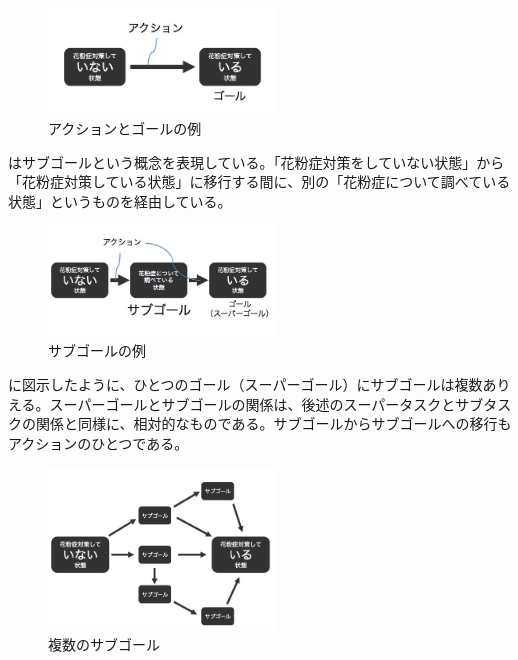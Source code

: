 \documentclass[submit,techreq]{ipsj}
\begin{document}
\begin{figure}[tb]
\includegraphics[width=6cm, bb=0 0 400 300]{action_goal.jpg}
\caption{アクションとゴールの例}
\label{fig:action_goal}
\end{figure}

はサブゴールという概念を表現している。「花粉症対策をしていない状態」から「花粉症対策している状態」に移行する間に、別の「花粉症について調べている状態」というものを経由している。


\begin{figure}[tb]
\includegraphics[width=6cm, bb=0 0 450 300]{sub_goal.jpg}
\caption{サブゴールの例}
\label{fig:sub_goal}
\end{figure}



に図示したように、ひとつのゴール（スーパーゴール）にサブゴールは複数ありえる。スーパーゴールとサブゴールの関係は、後述のスーパータスクとサブタスクの関係と同様に、相対的なものである。サブゴールからサブゴールへの移行もアクションのひとつである。



\begin{figure}[tb]
\includegraphics[width=6cm, bb=0 0 450 400]{many_sub_goals.jpg}
\caption{複数のサブゴール}
\label{fig:many_sub_goals}
\end{figure}
\end{document}

